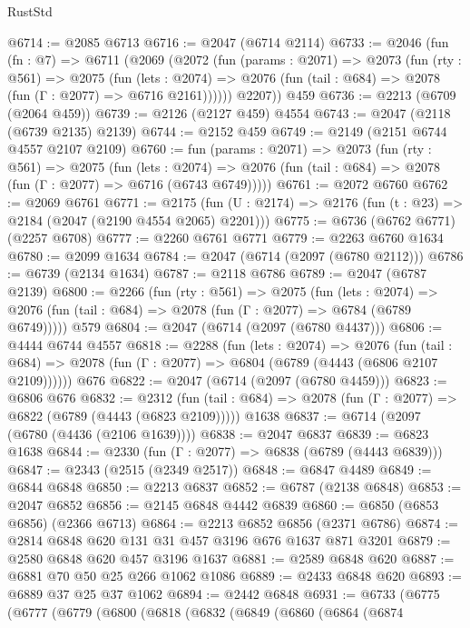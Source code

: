 \begin{lexlean}{RustStd}
\begin{coremodule}
@6714 := @2085 @6713
@6716 := @2047 (@6714 @2114)
@6733 := @2046
    (fun (fn : @7) =>
    @6711
      (@2069
        (@2072
          (fun (params : @2071) =>
          @2073
            (fun (rty : @561) =>
            @2075
              (fun (lets : @2074) =>
              @2076 (fun (tail : @684) => @2078 (fun (Γ : @2077) => @6716 @2161))))))
        @2207))
    @459
@6736 := @2213 (@6709 (@2064 @459))
@6739 := @2126 (@2127 @459) @4554
@6743 := @2047 (@2118 (@6739 @2135) @2139)
@6744 := @2152 @459
@6749 := @2149 (@2151 @6744 @4557 @2107 @2109)
@6760 := fun (params : @2071) =>
  @2073
    (fun (rty : @561) =>
    @2075
      (fun (lets : @2074) =>
      @2076 (fun (tail : @684) => @2078 (fun (Γ : @2077) => @6716 (@6743 @6749)))))
@6761 := @2072 @6760
@6762 := @2069 @6761
@6771 := @2175 (fun (U : @2174) => @2176 (fun (t : @23) => @2184 (@2047 (@2190 @4554 @2065) @2201)))
@6775 := @6736 (@6762 @6771) (@2257 @6708)
@6777 := @2260 @6761 @6771
@6779 := @2263 @6760 @1634
@6780 := @2099 @1634
@6784 := @2047 (@6714 (@2097 (@6780 @2112)))
@6786 := @6739 (@2134 @1634)
@6787 := @2118 @6786
@6789 := @2047 (@6787 @2139)
@6800 := @2266
    (fun (rty : @561) =>
    @2075
      (fun (lets : @2074) =>
      @2076 (fun (tail : @684) => @2078 (fun (Γ : @2077) => @6784 (@6789 @6749)))))
    @579
@6804 := @2047 (@6714 (@2097 (@6780 @4437)))
@6806 := @4444 @6744 @4557
@6818 := @2288
    (fun (lets : @2074) =>
    @2076
      (fun (tail : @684) => @2078 (fun (Γ : @2077) => @6804 (@6789 (@4443 (@6806 @2107 @2109))))))
    @676
@6822 := @2047 (@6714 (@2097 (@6780 @4459)))
@6823 := @6806 @676
@6832 := @2312
    (fun (tail : @684) => @2078 (fun (Γ : @2077) => @6822 (@6789 (@4443 (@6823 @2109)))))
    @1638
@6837 := @6714 (@2097 (@6780 (@4436 (@2106 @1639))))
@6838 := @2047 @6837
@6839 := @6823 @1638
@6844 := @2330 (fun (Γ : @2077) => @6838 (@6789 (@4443 @6839)))
@6847 := @2343 (@2515 (@2349 @2517))
@6848 := @6847 @4489
@6849 := @6844 @6848
@6850 := @2213 @6837
@6852 := @6787 (@2138 @6848)
@6853 := @2047 @6852
@6856 := @2145 @6848 @4442 @6839
@6860 := @6850 (@6853 @6856) (@2366 @6713)
@6864 := @2213 @6852 @6856 (@2371 @6786)
@6874 := @2814 @6848 @620 @131 @31 @457 @3196 @676 @1637 @871 @3201
@6879 := @2580 @6848 @620 @457 @3196 @1637
@6881 := @2589 @6848 @620
@6887 := @6881 @70 @50 @25 @266 @1062 @1086
@6889 := @2433 @6848 @620
@6893 := @6889 @37 @25 @37 @1062
@6894 := @2442 @6848
@6931 := @6733
    (@6775
      (@6777
        (@6779
          (@6800
            (@6818
              (@6832
                (@6849
                  (@6860
                    (@6864
                      (@6874

\end{coremodule}
\end{lexlean}
